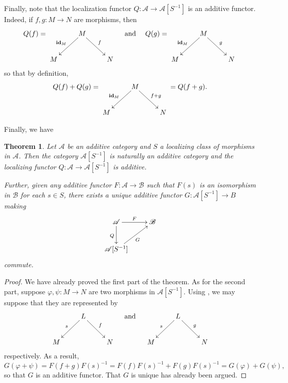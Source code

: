 \documentclass[11pt]{article}
\theoremstyle{thmstyle}
\newtheorem{theorem}{Theorem}[section]
\theoremstyle{defstyle}
\newcommand{\id}{\mathbf{id}}
\newcommand{\scrA}{\mathscr{A}}
\newcommand{\scrB}{\mathscr{B}}
\begin{document}
Finally, note that the localization functor $Q\colon\scrA\to\scrA[S^{-1}]$ is an additive functor. Indeed, if $f, g\colon M\to N$ are morphisms, then 
\begin{equation*}
	Q(f) = 
	\xymatrix {
		& M\ar[ld]_{\id_M}\ar[rd]^f & \\
		M & & N
	}\quad\text{ and }\quad 
	Q(g) = 
	\xymatrix {
		& M\ar[ld]_{\id_M}\ar[rd]^g & \\
		M & & N
	}
\end{equation*}
so that by definition,
\begin{equation*}
	Q(f) + Q(g) = 
	\xymatrix {
		& M\ar[rd]^{f + g}\ar[ld]_{\id_M} & \\
		M & & N
	} = Q(f + g).
\end{equation*}

Finally, we have 
\begin{theorem}
	Let $\scrA$ be an additive category and $S$ a localizing class of morphisms in $\scrA$. Then the category $\scrA[S^{-1}]$ is naturally an additive category and the localizing functor $Q\colon\scrA\to\scrA[S^{-1}]$ is additive. 

	Further, given any additive functor $F\colon\scrA\to\scrB$ such that $F(s)$ is an isomorphism in $\scrB$ for each $s\in S$, there exists a unique additive functor $G\colon\scrA[S^{-1}]\to B$ making 
	\begin{equation*}
	\xymatrix {
		\scrA\ar[r]^F\ar[d]_Q & \scrB\\
		\scrA[S^{-1}]\ar[ru]_G
	}
	\end{equation*}
	commute.
\end{theorem}
\begin{proof}
	We have already proved the first part of the theorem. As for the second part, suppose $\varphi,\psi\colon M\to N$ are two morphisms in $\scrA[S^{-1}]$. Using , we may suppose that they are represented by 
	\begin{equation*}
		\xymatrix {
			& L\ar[ld]_s\ar[rd]^f & \\
			M &  & N
		}\quad\text{ and }\quad 
		\xymatrix {
			& L\ar[ld]_s\ar[rd]^g & \\
			M & & N
		}
	\end{equation*}
	respectively. As a result, 
	\begin{equation*}
		G(\varphi + \psi) = F(f + g)F(s)^{-1} = F(f)F(s)^{-1} + F(g)F(s)^{-1} = G(\varphi) + G(\psi),
	\end{equation*}
	so that $G$ is an additive functor. That $G$ is unique has already been argued.
\end{proof}
\end{document}
